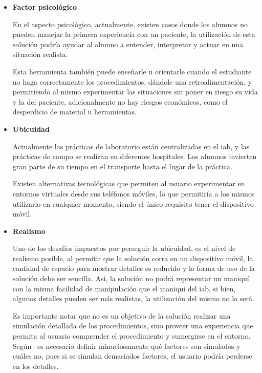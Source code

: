\begin{itemize}
    
\item \textbf{Factor psicológico}

    En el aspecto psicológico, actualmente, existen casos donde los alumnos no
    pueden manejar la primera experiencia con un paciente, la utilización de
    esta solución podría ayudar %
    al alumno a entender, interpretar y actuar en una situación realista.   
    
    Esta herramienta también puede enseñarle u orientarle cuando el estudiante
    no haga correctamente los procedimientos, dándole una retroalimentación, y
    permitiendo al mismo experimentar las situaciones sin poner en riesgo su
    vida y la del paciente, adicionalmente no hay riesgos económicos, como el
    desperdicio de material u herramientas.
    
\item \textbf{Ubicuidad}

    Actualmente las prácticas de laboratorio están centralizadas en el
    \Gls{iab}, y las prácticas de campo se realizan en diferentes hospitales.
    Los alumnos invierten gran parte de su tiempo en el transporte hasta el
    lugar de la práctica.
    
    Existen alternativas tecnológicas que permiten al usuario experimentar en
    entornos virtuales desde sus teléfonos móviles, lo que permitiría a los
    mismos utilizarlo en cualquier momento, siendo el único requisito tener el
    dispositivo móvil.
    
    
\item \textbf{Realismo}
    
    
    Uno de los desafíos impuestos por perseguir la ubicuidad, es el nivel de
    realismo posible, al permitir que la solución corra en un dispositivo móvil,
    la cantidad de espacio para mostrar detalles es reducido y la forma de
    uso de la solución debe ser sencilla. Así, la solución no podrá representar
    un maniquí con la misma facilidad de manipulación que el maniquí del
    \Gls{iab}, si bien, algunos detalles pueden ser más realistas, la
    utilización del mismo no lo será.
    
    Es importante notar que no es un objetivo de la solución realizar una
    simulación detallada de los procedimientos, sino proveer una experiencia que
    permita al usuario comprender el procedimiento y sumergirse en el entorno.
    Según~\cite{videojuegos:gonzaleztardon} es necesario definir minuciosamente
    qué factores son simulados y cuáles no, pues si se simulan demasiados
    factores, el usuario podría perderse en los detalles. 
    

\end{itemize}
